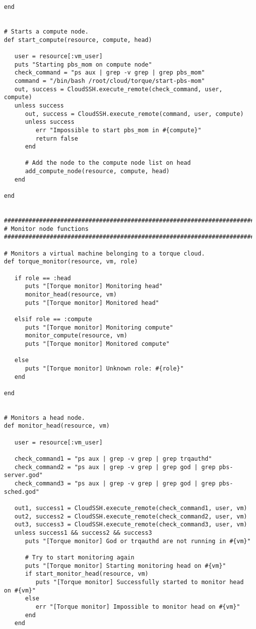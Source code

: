 \begin{lstlisting}
end


# Starts a compute node.
def start_compute(resource, compute, head)

   user = resource[:vm_user]
   puts "Starting pbs_mom on compute node"
   check_command = "ps aux | grep -v grep | grep pbs_mom"
   command = "/bin/bash /root/cloud/torque/start-pbs-mom"
   out, success = CloudSSH.execute_remote(check_command, user, compute)
   unless success
      out, success = CloudSSH.execute_remote(command, user, compute)
      unless success
         err "Impossible to start pbs_mom in #{compute}"
         return false
      end
      
      # Add the node to the compute node list on head
      add_compute_node(resource, compute, head)
   end

end


################################################################################
# Monitor node functions
################################################################################

# Monitors a virtual machine belonging to a torque cloud.
def torque_monitor(resource, vm, role)

   if role == :head
      puts "[Torque monitor] Monitoring head"
      monitor_head(resource, vm)
      puts "[Torque monitor] Monitored head"

   elsif role == :compute
      puts "[Torque monitor] Monitoring compute"
      monitor_compute(resource, vm)
      puts "[Torque monitor] Monitored compute"

   else
      puts "[Torque monitor] Unknown role: #{role}"
   end
   
end


# Monitors a head node.
def monitor_head(resource, vm)

   user = resource[:vm_user]

   check_command1 = "ps aux | grep -v grep | grep trqauthd"
   check_command2 = "ps aux | grep -v grep | grep god | grep pbs-server.god"
   check_command3 = "ps aux | grep -v grep | grep god | grep pbs-sched.god"
   
   out1, success1 = CloudSSH.execute_remote(check_command1, user, vm)
   out2, success2 = CloudSSH.execute_remote(check_command2, user, vm)
   out3, success3 = CloudSSH.execute_remote(check_command3, user, vm)
   unless success1 && success2 && success3
      puts "[Torque monitor] God or trqauthd are not running in #{vm}"
      
      # Try to start monitoring again
      puts "[Torque monitor] Starting monitoring head on #{vm}"
      if start_monitor_head(resource, vm)
         puts "[Torque monitor] Successfully started to monitor head on #{vm}"
      else
         err "[Torque monitor] Impossible to monitor head on #{vm}"
      end
   end
   

\end{lstlisting}
